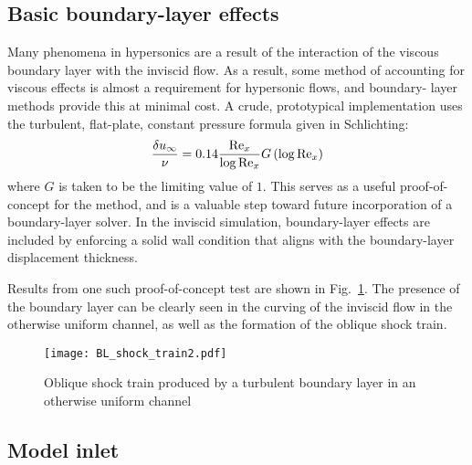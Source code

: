 \subsection{Basic boundary-layer effects}
Many phenomena in hypersonics are a result of the interaction of the viscous boundary layer with the inviscid flow. As a result, some method of accounting for viscous effects is almost a requirement for hypersonic flows, and boundary- layer methods provide this at minimal cost.
A crude, prototypical implementation uses the turbulent, flat-plate, constant pressure formula given in Schlichting\cite{Schlichting2000}:
\[\frac{{\delta {u_\infty }}}{\nu } = 0.14\frac{{{{{\mathop{\rm Re}\nolimits} }_x}}}{{\log {{{\mathop{\rm Re}\nolimits} }_x}}}G\left( {\log {{{\mathop{\rm Re}\nolimits} }_x}} \right)\]
where $G$ is taken to be the limiting value of $1$. This serves as a useful proof-of-concept for the method, and is a valuable step toward future incorporation of a boundary-layer solver. In the inviscid simulation, boundary-layer effects are included by enforcing a solid wall condition that aligns with the boundary-layer displacement thickness. 

Results from one such proof-of-concept test are shown in Fig.~\ref{fig:bl-shock-train}. The presence of the boundary layer can be clearly seen in the curving of the inviscid flow in the otherwise uniform channel, as well as the formation of the oblique shock train.

\begin{figure}[p]
  \centering
  \texttt{[image: BL\_shock\_train2.pdf]}
  \caption[Channel Flow With a Turbulent Boundary Layer]{Oblique shock train produced by a turbulent boundary layer in an otherwise uniform channel}
  \label{fig:bl-shock-train}
\end{figure}

\subsection{Model inlet}

